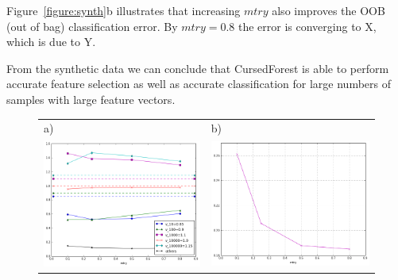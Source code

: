 \documentclass[10pt,a4paper]{article}  %
\begin{document}
Figure~\ref{figure:synth}b illustrates that increasing $mtry$ also improves the OOB (out of bag) classification error. 
By $mtry=0.8$ the error is converging to X, which is due to Y.

From the synthetic data we can conclude that CursedForest is able to perform accurate feature selection as well as accurate classification for large numbers of samples with large feature vectors. 

\begin{figure}[tbhp]
\begin{tabular}{ll}
a)& b)\\
\includegraphics[totalheight=6cm]{./figs/var_oder.png} & 
\includegraphics[totalheight=6cm]{./figs/var_oob.png} \\

\end{tabular}
\end{figure}
\end{document}
